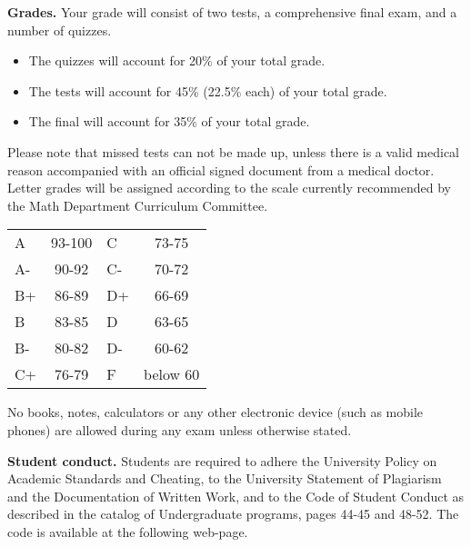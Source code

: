 \documentclass{article}
\begin{document}


\medskip
\noindent \textbf{Grades.} Your grade will consist of two tests, a comprehensive final exam, and a number of quizzes. 
\begin{itemize}
\item The quizzes will account for 20\% of your total grade.
\item The tests will account for 45\% (22.5\% each) of your total grade.
\item The final will account for 35\% of your total grade.
\end{itemize}
Please note that missed tests can not be made up, unless there is a valid medical reason accompanied with an official signed document from a medical doctor. Letter grades will be assigned according to the scale currently recommended by the Math Department Curriculum Committee. 

\begin{center}
\begin{tabular}{lc|lc}
A & 93-100 & C  & 73-75 \\
A-& 90-92  & C- & 70-72 \\
B+& 86-89  & D+ & 66-69 \\
B & 83-85  & D  & 63-65\\
B-& 80-82  & D- & 60-62\\
C+& 76-79  & F  & below 60\\
\end{tabular}

\end{center}

No books, notes, calculators or any other electronic device (such as mobile phones) are allowed during any exam unless otherwise stated.

\medskip
\noindent \textbf{Student conduct.} Students  are required to adhere the University Policy on Academic Standards and Cheating, to the University Statement of Plagiarism and the Documentation of Written Work, and to the Code of Student Conduct as described in the catalog of Undergraduate programs, pages 44-45 and 48-52. The code is available at the following web-page.
\end{document}
